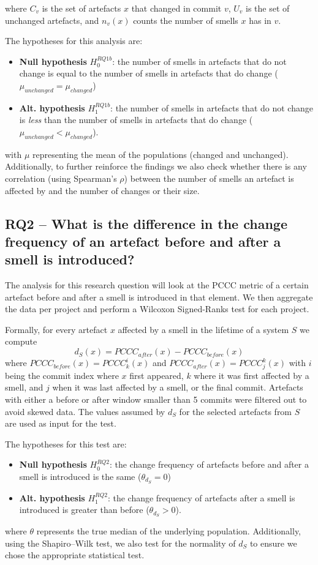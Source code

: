 where $C_v$ is the set of artefacts $x$ that changed in commit $v$, $U_v$ is the set of unchanged artefacts, and $n_v(x)$ counts the number of smells $x$ has in $v$.
 
The hypotheses for this analysis are:
\begin{itemize}
    \item \textbf{Null hypothesis} $H^{RQ1b}_0$: the number of smells in artefacts that do not change is equal to the number of smells in artefacts that do change ($\mu_{unchanged} = \mu_{changed} $)
    \item \textbf{Alt. hypothesis} $H^{RQ1b}_1$: the number of smells in artefacts that do not change is \emph{less} than the number of smells in artefacts that do change  ($\mu_{unchanged} < \mu_{changed} $).
\end{itemize}
with $\mu$ representing the mean of the populations (changed and unchanged).
Additionally, to further reinforce the findings we also check whether there is any correlation (using Spearman's $\rho$) between the number of smells an artefact is affected by and the number of changes or their size.

\subsection{RQ2 -- What is the difference in the change frequency of an artefact before and after a smell is introduced?}\label{c5:sec:rq2-analysis}
The analysis for this research question will look at the PCCC metric of a certain artefact before and after a smell is introduced in that element. We then aggregate the data per project and perform a Wilcoxon Signed-Ranks test \cite{Sheskin2007} for each project.

Formally, for every artefact $x$ affected by a smell in the lifetime of a system $S$ we compute 
$$d_S(x) = PCCC_{after}(x) - PCCC_{before}(x)$$
where $PCCC_{before}(x) = PCCC^i_k(x)$ and $PCCC_{after}(x) = PCCC^k_j(x)$ with $i$ being the commit index where $x$ first appeared, $k$ where it was first affected by a smell, and $j$ when it was last affected by a smell, or the final commit.
Artefacts with either a before or after window smaller than 5 commits were filtered out to avoid skewed data.
The values assumed by $d_S$ for the selected artefacts from $S$ are used as input for the test.

The hypotheses for this test are:
\begin{itemize}
    \item \textbf{Null hypothesis} $H^{RQ2}_0$: the change frequency of artefacts before and after a smell is introduced is the same ($\theta_{d_S} = 0$)
    \item \textbf{Alt. hypothesis} $H^{RQ2}_1$: the change frequency of artefacts after a smell is introduced is greater than before ($\theta_{d_S} > 0$). 
\end{itemize}
where $\theta$ represents the true median of the underlying population.
Additionally, using the Shapiro–Wilk test, we also test for the normality of $d_S$ to ensure we chose the appropriate statistical test.

